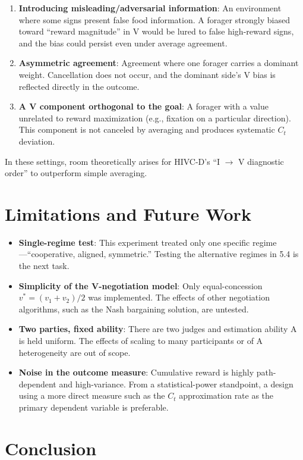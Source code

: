 \documentclass[11pt]{article}
\newcommand{\Ct}{\ensuremath{C_t}}
\begin{document}
\begin{enumerate}[nosep]
  \item \textbf{Introducing misleading/adversarial information}: An environment where some signs present false food information. A forager strongly biased toward ``reward magnitude'' in V would be lured to false high-reward signs, and the bias could persist even under average agreement.
  \item \textbf{Asymmetric agreement}: Agreement where one forager carries a dominant weight. Cancellation does not occur, and the dominant side's V bias is reflected directly in the outcome.
  \item \textbf{A V component orthogonal to the goal}: A forager with a value unrelated to reward maximization (e.g., fixation on a particular direction). This component is not canceled by averaging and produces systematic \Ct{} deviation.
\end{enumerate}

In these settings, room theoretically arises for HIVC-D's ``I $\to$ V diagnostic order'' to outperform simple averaging.

\section{Limitations and Future Work}

\begin{itemize}[nosep]
  \item \textbf{Single-regime test}: This experiment treated only one specific regime---``cooperative, aligned, symmetric.'' Testing the alternative regimes in 5.4 is the next task.
  \item \textbf{Simplicity of the V-negotiation model}: Only equal-concession $v^*=(v_1+v_2)/2$ was implemented. The effects of other negotiation algorithms, such as the Nash bargaining solution, are untested.
  \item \textbf{Two parties, fixed ability}: There are two judges and estimation ability A is held uniform. The effects of scaling to many participants or of A heterogeneity are out of scope.
  \item \textbf{Noise in the outcome measure}: Cumulative reward is highly path-dependent and high-variance. From a statistical-power standpoint, a design using a more direct measure such as the \Ct{} approximation rate as the primary dependent variable is preferable.
\end{itemize}

\section{Conclusion}
\end{document}
